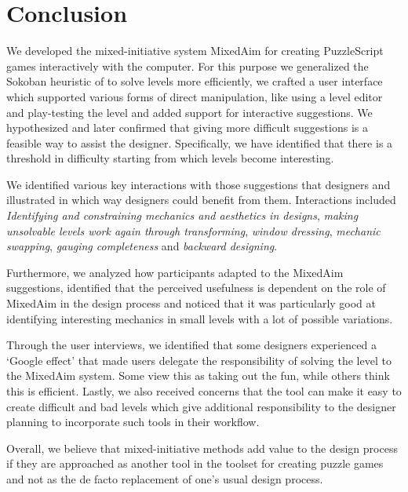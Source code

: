 
\section{Conclusion}

We developed the mixed-initiative system MixedAim for creating PuzzleScript games interactively with the computer. For this purpose we generalized the Sokoban heuristic of \cite{Jurgen} to solve levels more efficiently, we crafted a user interface which supported various forms of direct manipulation, like using a level editor and play-testing the level and added support for interactive suggestions. We hypothesized and later confirmed that giving more difficult suggestions is a feasible way to assist the designer. Specifically, we have identified that there is a threshold in difficulty starting from which levels become interesting.

We identified various key interactions with those suggestions that designers and illustrated in which way designers could benefit from them. Interactions included \textit{Identifying and constraining mechanics and aesthetics in designs}, \textit{making unsolvable levels work again through transforming},  \textit{window dressing}, \textit{mechanic swapping}, \textit{gauging completeness} and \textit{backward designing}.

Furthermore, we analyzed how participants adapted to the MixedAim suggestions, identified that the perceived usefulness is dependent on the role of MixedAim in the design process and noticed that it was particularly good at identifying interesting mechanics in small levels with a lot of possible variations.

Through the user interviews, we identified that some designers experienced a `Google effect' that made users delegate the responsibility of solving the level to the MixedAim system. Some view this as taking out the fun, while others think this is efficient. Lastly, we also received concerns that the tool can make it easy to create difficult and bad levels which give additional responsibility to the designer planning to incorporate such tools in their workflow.

Overall, we believe that mixed-initiative methods add value to the design process if they are approached as another tool in the toolset for creating puzzle games and not as the de facto replacement of one's usual design process.
